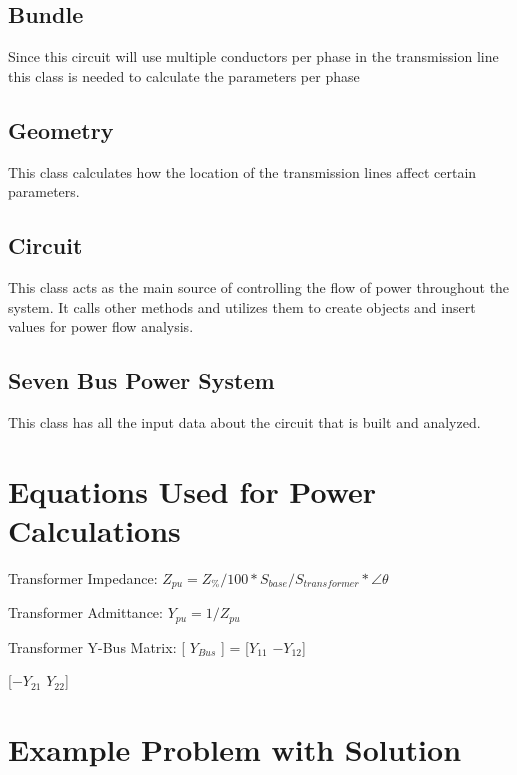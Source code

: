 \documentclass{article}
\begin{document}
	\subsection{Bundle}
	Since this circuit will use multiple conductors per phase in the transmission line this class is needed to calculate the parameters per phase
	
	\subsection{Geometry}
	This class calculates how the location of the transmission lines affect certain parameters.
	
	\subsection{Circuit}
	This class acts as the main source of controlling the flow of power throughout the system. It calls other methods and utilizes them to create objects and insert values for power flow analysis.
	
	\subsection{Seven Bus Power System}
	This class has all the input data about the circuit that is built and analyzed.
	
	\section{Equations Used for Power Calculations}
	\noindent
	Transformer Impedance: $Z_{pu} = Z_\% / 100 * S_{base} / S_{transformer} * \angle{\theta}$
	
	\noindent
	Transformer Admittance: $Y_{pu} = 1 / Z_{pu}$
	
	\noindent
	Transformer Y-Bus Matrix: [ $Y_{Bus}$ ] = [$Y_{11}$ $-Y_{12}$]
	
	\noindent
	\phantom{Transformer Y-Bus Matrix: [ $Y_{Bus}$ ] = }[$-Y_{21}$ $Y_{22}$]
	
	\section{Example Problem with Solution}
	
\end{document}
